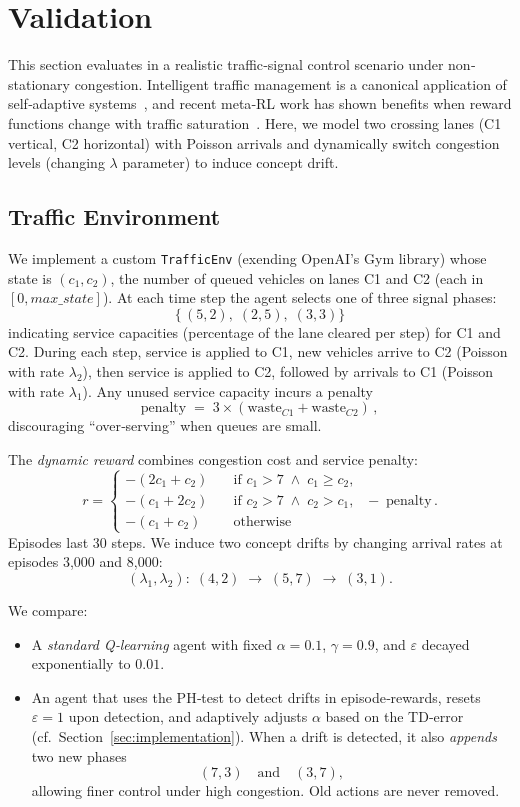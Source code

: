 
\section{Validation}
\label{sec:validation}

This section evaluates \adaptiverl in a realistic traffic‐signal control scenario under non‐stationary congestion. Intelligent traffic management is a canonical application of self‐adaptive systems~\cite{HENRICHS2022106940}, and recent meta‐\ac{RL} work has shown benefits when reward functions change with traffic saturation~\cite{meta-rl-traffic}. Here, we model two crossing lanes (C1 vertical, C2 horizontal) with Poisson arrivals and dynamically switch congestion levels (changing $\lambda$ parameter) to induce concept drift.  

\subsection{Traffic Environment}
We implement a custom \texttt{TrafficEnv} (exending OpenAI's Gym library) whose state is $(c_1,c_2)$, the number of queued vehicles on lanes C1 and C2 (each in $[0,\mathit{max\_state}]$). At each time step the agent selects one of three signal phases:
\[
\{\,(5,2),\;(2,5),\;(3,3)\}
\]
indicating service capacities (percentage of the lane cleared per step) for C1 and C2. During each step, service is applied to C1, new vehicles arrive to C2 (Poisson with rate $\lambda_{2}$), then service is applied to C2, followed by arrivals to C1 (Poisson with rate $\lambda_{1}$). Any unused service capacity incurs a penalty
\[
\mathrm{penalty} \;=\; 3\times(\text{waste}_{C1} + \text{waste}_{C2})\,,
\]
discouraging “over‐serving” when queues are small.

The \emph{dynamic reward} combines congestion cost and service penalty:
\[
r = 
\begin{cases}
-(2c_1 + c_2)\quad &\text{if }c_1>7 \;\wedge\;c_1\ge c_2,\\
-(c_1 + 2c_2)\quad &\text{if }c_2>7 \;\wedge\;c_2>c_1,\\
-(c_1 + c_2)\quad &\text{otherwise}
\end{cases}
\;-\;\mathrm{penalty}\,.
\]
Episodes last 30 steps. We induce two concept drifts by changing arrival rates at episodes 3,000 and 8,000:
\[
(\lambda_1,\lambda_2):
\;(4,2)\;\to\;(5,7)\;\to\;(3,1).
\]

We compare:
\begin{itemize}
  \item A \emph{standard Q‐learning} agent with fixed $\alpha=0.1$, $\gamma=0.9$, and $\varepsilon$ decayed exponentially to $0.01$.
  \item An \emph{\adaptiverl} agent that uses the PH‐test to detect drifts in episode‐rewards, resets $\varepsilon\!=\!1$ upon detection, and adaptively adjusts $\alpha$ based on the TD‐error (cf.\ Section~\ref{sec:implementation}).  When a drift is detected, it also \emph{appends} two new phases
  \[
    (7,3)\quad\text{and}\quad(3,7),
  \]
  allowing finer control under high congestion. Old actions are never removed.
\end{itemize}

